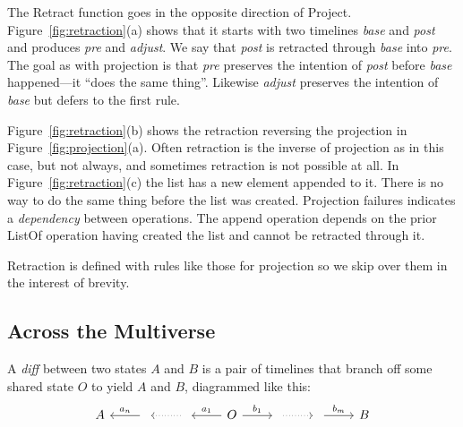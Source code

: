 \documentclass[english,submission]{programming}
\theoremstyle{definition}
\begin{document}
The \textsf{Retract} function goes in the opposite direction of \textsf{Project}. Figure~\ref{fig:retraction}(a) shows that it starts with two timelines \textit{base} and \textit{post} and produces \textit{pre} and \textit{adjust}. We say that \textit{post} is retracted through \textit{base} into \textit{pre}. The goal as with projection is that \textit{pre} preserves the intention of \textit{post} before \textit{base} happened---it ``does the same thing''. Likewise \textit{adjust} preserves the intention of \textit{base} but defers to the first rule.

Figure~\ref{fig:retraction}(b) shows the retraction reversing the projection in Figure~\ref{fig:projection}(a). Often retraction is the inverse of projection as in this case, but not always, and sometimes retraction is not possible at all. In Figure~\ref{fig:retraction}(c) the list has a new element appended to it. There is no way to do the same thing before the list was created. Projection failures indicates a \textit{dependency} between operations. The \textsf{append} operation depends on the prior \textsf{ListOf} operation having created the list and cannot be retracted through it.

Retraction is defined with rules like those for projection so we skip over them in the interest of brevity.


\subsection{Across the Multiverse}

A \textit{diff} between two states $A$ and $B$ is a pair of timelines that branch off some shared state $O$ to yield $A$ and $B$, diagrammed like this:
\[\begin{tikzcd}
	A & {} & {} & O & {} & {} & B
	\arrow["{{a_n}}"', from=1-2, to=1-1]
	\arrow[dotted, from=1-3, to=1-2]
	\arrow["{{a_1}}"', from=1-4, to=1-3]
	\arrow["{b_1}", from=1-4, to=1-5]
	\arrow[dotted, from=1-5, to=1-6]
	\arrow["{b_m}", from=1-6, to=1-7]
\end{tikzcd}\]
\end{document}
